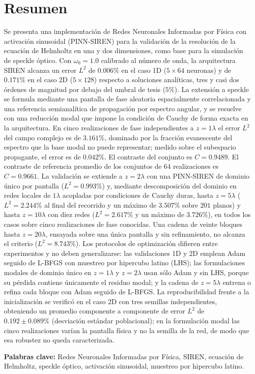 
\chapter*{Resumen}

\vspace*{-8mm}

Se presenta una implementación de Redes Neuronales Informadas por Física con
activación sinusoidal (PINN-SIREN) para la validación de la resolución de la
ecuación de Helmholtz en una y dos dimensiones, como base para la simulación
de speckle óptico.
Con $\omega_0 = 1.0$ calibrado al número de onda, la arquitectura SIREN
alcanza un error $L^2$ de $0.006\%$ en el caso 1D ($5 \times 64$ neuronas) y
de $0.171\%$ en el caso 2D ($5 \times 128$) respecto a soluciones analíticas,
tres y casi dos órdenes de magnitud por debajo del umbral de tesis ($5\%$).
La extensión a speckle se formula mediante una pantalla de fase aleatoria
espacialmente correlacionada y una referencia semianalítica de propagación
por espectro angular, y se resuelve con una reducción modal que impone la
condición de Cauchy de forma exacta en la arquitectura. En cinco
realizaciones de fase independientes a $z=1\lambda$ el error $L^2$ del campo
complejo es de $3.161\%$, dominado por la fracción evanescente del espectro
que la base modal no puede representar; medido sobre el subespacio
propagante, el error es de $0.042\%$. El contraste del conjunto es
$C=0.9489$. El contraste de referencia promedio de los conjuntos de 64
realizaciones es $C=0.9661$.
La validación se extiende a $z=2\lambda$ con una PINN-SIREN de dominio único
por pantalla
($L^2=0.993\%$) y, mediante descomposición del dominio en redes locales de
$1\lambda$ acopladas por condiciones de Cauchy duras, hasta $z=5\lambda$
($L^2=2.244\%$ al final del recorrido y un máximo de $3.507\%$ sobre $201$
planos) y hasta $z=10\lambda$ con diez redes ($L^2=2.617\%$ y un máximo de
$3.726\%$), en todos los casos sobre cinco realizaciones de fase conocidas.
Una cadena de veinte bloques hasta $z=20\lambda$, ensayada sobre una única
pantalla y sin refinamiento, no alcanza el criterio ($L^2=8.743\%$).
Los protocolos de optimización difieren entre experimentos y no deben
generalizarse: las validaciones 1D y 2D emplean Adam seguido de L-BFGS con
muestreo por hipercubo latino (LHS); las formulaciones modales de dominio único
en $z=1\lambda$ y $z=2\lambda$ usan sólo Adam y sin LHS, porque su pérdida
contiene únicamente el residuo modal; y la cadena de $z=5\lambda$ entrena o
refina cada bloque con Adam seguido de L-BFGS. La reproducibilidad frente a la
inicialización se verificó en el caso 2D con tres semillas independientes,
obteniendo un promedio componente a componente de error $L^2$ de
$0.192 \pm 0.089\%$ (desviación estándar poblacional); en la formulación modal
las cinco realizaciones varían la pantalla física y no la semilla de la red, de
modo que esa robustez no queda caracterizada.

\bigskip

\noindent\textbf{Palabras clave:} Redes Neuronales Informadas por Física,
SIREN, ecuación de Helmholtz, speckle óptico, activación sinusoidal,
muestreo por hipercubo latino.
